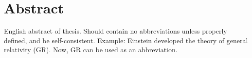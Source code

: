 \section*{Abstract} %



English abstract of thesis. Should contain no abbreviations unless properly defined, and be self-consistent. 
Example: Einstein developed the theory of general relativity (GR). Now, GR can be used as an abbreviation.


\cleardoublepage